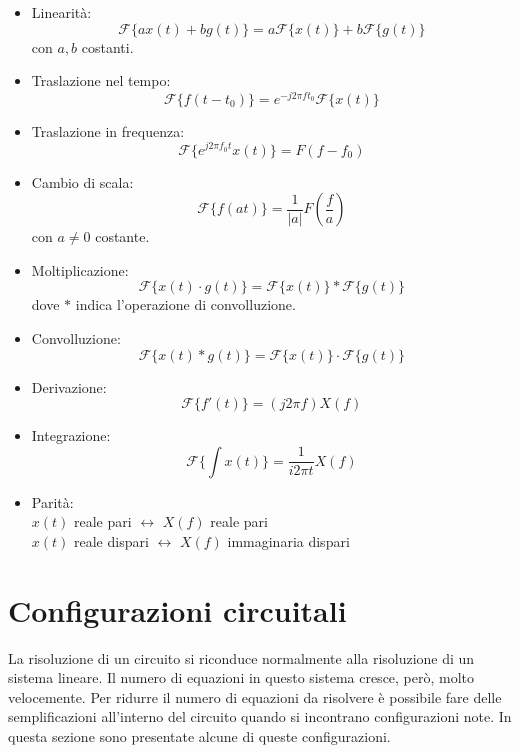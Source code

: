 \documentclass{article}
\begin{document}
\begin{itemize}
    \item Linearità: 
    $$\mathcal{F}\{a x(t) + b g(t)\} = a \mathcal{F}\{x(t)\} + b \mathcal{F}\{g(t)\}$$
    con $a,b$ costanti.
    
    \item Traslazione nel tempo:
    $$ \mathcal{F}\{f(t - t_0)\} = e^{-j 2 \pi f t_0} \mathcal{F}\{x(t)\} $$

    \item Traslazione in frequenza:
    $$ \mathcal{F}\{e^{j 2 \pi f_0 t} x(t)\} = F(f - f_0) $$

    \item Cambio di scala:
    $$ \mathcal{F}\{f(at)\} = \frac{1}{|a|} F\left(\frac{f}{a}\right) $$
    con $a\neq0$ costante.

    \item Moltiplicazione:
    $$ \mathcal{F}\{x(t) \cdot g(t)\} = \mathcal{F}\{x(t)\} * \mathcal{F}\{g(t)\} $$
    dove $*$ indica l'operazione di convolluzione.

    \item Convolluzione:
    $$ \mathcal{F}\{x(t) * g(t)\} = \mathcal{F}\{x(t)\} \cdot \mathcal{F}\{g(t)\} $$

    \item Derivazione:
    $$ \mathcal{F}\{f'(t)\} = (j 2 \pi f) X(f) $$

    \item Integrazione:
    $$ \mathcal{F}\{\int x(t)\} = \frac{1}{i 2 \pi t}X(f) $$

    \item Parità:\\
    $x(t)$ reale pari $\leftrightarrow$ $X(f)$ reale pari\\
    $x(t)$ reale dispari $\leftrightarrow$ $X(f)$ immaginaria dispari





\end{itemize}



\newpage
\section{Configurazioni circuitali}
La risoluzione di un circuito si riconduce normalmente alla risoluzione di un sistema lineare. Il numero di equazioni in questo sistema cresce, però, molto velocemente. Per ridurre il numero di equazioni da risolvere è possibile fare delle semplificazioni all'interno del circuito quando si incontrano configurazioni note. In questa sezione sono presentate alcune di queste configurazioni.
\end{document}
